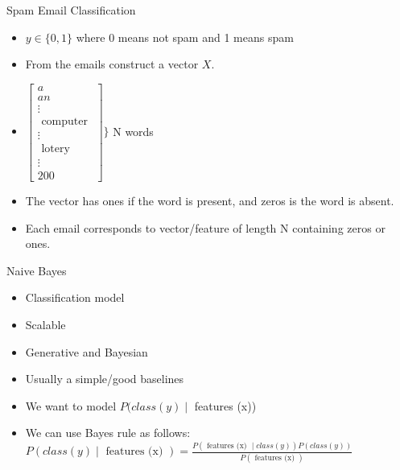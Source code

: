 \documentclass{beamer}
\begin{document}
\begin{frame}{Spam Email Classification}
    \begin{itemize}[<+->]
        \item $y \in\{0,1\}$ where 0 means not spam and 1 means spam
        \item From the emails construct a vector $X$.
        \item $\left[\begin{array}{c}a \\ a n \\ \vdots \\ \text { computer } \\ \vdots \\ \text { lotery } \\ \vdots \\ 200\end{array}\right]\}$ N words
        \item The vector has ones if the word is present, and zeros is the word is absent.
        \item Each email corresponds to vector/feature of length N containing zeros or ones.
    \end{itemize}
     
\end{frame}

\begin{frame}{Naive Bayes}
    \begin{itemize}[<+->]
        \item Classification model
        \item Scalable
        \item Generative and Bayesian
        \item Usually a simple/good baselines
        \item  We want to model $P(class (y) \mid$ features (x)) 
        \item We can use Bayes rule as follows:
        $P(class(y) \mid \text { features (x) })=\frac{P(\text { features (x) } \mid class(y)) P(class(y))}{P(\text { features (x) })}$
    \end{itemize}
    
   

\end{frame}
\end{document}
